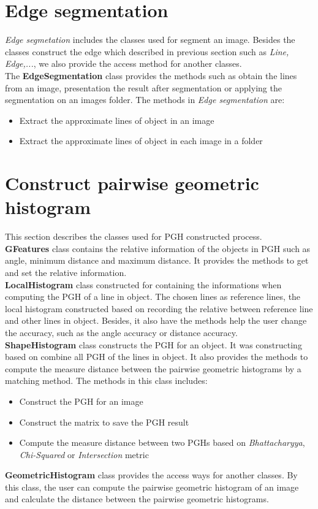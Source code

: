 \section{Edge segmentation }
\textit{Edge segmetation} includes the classes used for segment an image. Besides the classes construct the edge which described in previous section such as \textit{Line, Edge,...}, we also provide the access method for another classes.\\[0.2cm]
The \textbf{EdgeSegmentation} class provides the methods such as obtain the lines from an image, presentation the result after segmentation or applying the segmentation on an images folder. The methods in \textit{Edge segmentation} are:
\begin{itemize}
\item Extract the approximate lines of object in an image
\item Extract the approximate lines of object in each image in a folder
\end{itemize}
\section{Construct pairwise geometric histogram}
This section describes the classes used for PGH constructed process.\\[0.2cm]
\textbf{GFeatures} class contains the relative information of the objects in PGH such as angle, minimum distance and maximum distance. It provides the methods to get and set the relative information.\\[0.2cm]
\textbf{LocalHistogram} class constructed for containing the informations when computing the PGH of a line in object. The chosen lines as reference lines, the local histogram constructed based on recording the relative between reference line and other lines in object. Besides, it also have the methods help the user change the accuracy, such as the angle accuracy or distance accuracy.\\[0.2cm]
\textbf{ShapeHistogram} class constructs the PGH for an object. It was constructing based on combine all PGH of the lines in object. It also provides the methods to compute the measure distance between the pairwise geometric histograms by a matching method. The methods in this class includes:
\begin{itemize}
\item Construct the PGH for an image
\item Construct the matrix to save the PGH result
\item Compute the measure distance between two PGHs based on \textit{Bhattacharyya}, \textit{Chi-Squared} or \textit{Intersection} metric
\end{itemize}
\textbf{GeometricHistogram} class provides the access ways for another classes. By this class, the user can compute the pairwise geometric histogram of an image and calculate the distance between the pairwise geometric histograms.
